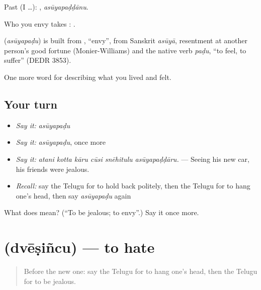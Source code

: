 Past (I …): , \emph{asūyapaḍḍānu}.

Who you envy takes :   .

\begin{cousinweb}
\textbf{} (\emph{asūyapaḍu}) is built from , \textquotedblleft{}envy\textquotedblright{}, from Sanskrit \emph{asūyā}, resentment at another person's good fortune (Monier-Williams) and the native verb \emph{paḍu}, \textquotedblleft{}to feel, to suffer\textquotedblright{} (DEDR 3853).
\end{cousinweb}

\begin{grammarlens}[title={What you've built}]
One more word for describing what you lived and felt.
\end{grammarlens}

\subsection*{Your turn}
\begin{itemize}
\raggedright
  \item \emph{Say it:} \emph{asūyapaḍu}
  \item \emph{Say it:} \emph{asūyapaḍu}, once more
  \item \emph{Say it:} \emph{atani kotta kāru cūsi snēhitulu asūyapaḍḍāru.} — Seeing his new car, his friends were jealous.
  \item \emph{Recall:} say the Telugu for to hold back politely, then the Telugu for to hang one's head, then say \emph{asūyapaḍu} again
\end{itemize}

\begin{tcolorbox}[breakable,colback=teal!4,colframe=teal!35!black,title={Before you move on}]
What does  mean? (\textquotedblleft{}To be jealous; to envy\textquotedblright{}.) Say it once more.
\end{tcolorbox}
\section[\texorpdfstring{\te{ద్వేషించు} (dvēṣiñcu)}{ద్వేషించు (dvēṣiñcu)}]{ (dvēṣiñcu) — to hate}

\label{lesson:TE-C499-dvesincu}



\begin{quote}
Before the new one: say the Telugu for to hang one's head, then the Telugu for to be jealous.
\end{quote}

